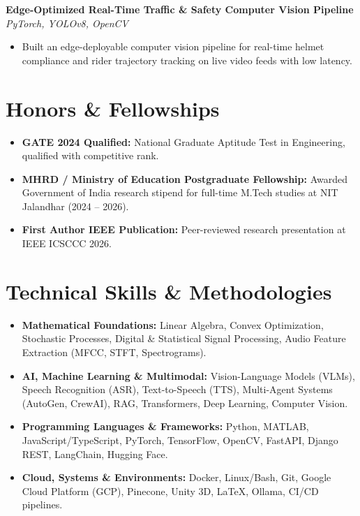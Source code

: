 \documentclass[10pt,a4paper]{article}
\begin{document}
\vspace{3pt}
\textbf{Edge-Optimized Real-Time Traffic \& Safety Computer Vision Pipeline} \hfill \textit{PyTorch, YOLOv8, OpenCV}
\begin{itemize}
    \item Built an edge-deployable computer vision pipeline for real-time helmet compliance and rider trajectory tracking on live video feeds with low latency.
\end{itemize}

\section*{Honors \& Fellowships}
\begin{itemize}
    \item \textbf{GATE 2024 Qualified:} National Graduate Aptitude Test in Engineering, qualified with competitive rank.
    \item \textbf{MHRD / Ministry of Education Postgraduate Fellowship:} Awarded Government of India research stipend for full-time M.Tech studies at NIT Jalandhar (2024 -- 2026).
    \item \textbf{First Author IEEE Publication:} Peer-reviewed research presentation at IEEE ICSCCC 2026.
\end{itemize}

\section*{Technical Skills \& Methodologies}
\begin{itemize}
    \item \textbf{Mathematical Foundations:} Linear Algebra, Convex Optimization, Stochastic Processes, Digital \& Statistical Signal Processing, Audio Feature Extraction (MFCC, STFT, Spectrograms).
    \item \textbf{AI, Machine Learning \& Multimodal:} Vision-Language Models (VLMs), Speech Recognition (ASR), Text-to-Speech (TTS), Multi-Agent Systems (AutoGen, CrewAI), RAG, Transformers, Deep Learning, Computer Vision.
    \item \textbf{Programming Languages \& Frameworks:} Python, MATLAB, JavaScript/TypeScript, PyTorch, TensorFlow, OpenCV, FastAPI, Django REST, LangChain, Hugging Face.
    \item \textbf{Cloud, Systems \& Environments:} Docker, Linux/Bash, Git, Google Cloud Platform (GCP), Pinecone, Unity 3D, LaTeX, Ollama, CI/CD pipelines.
\end{itemize}
\end{document}
